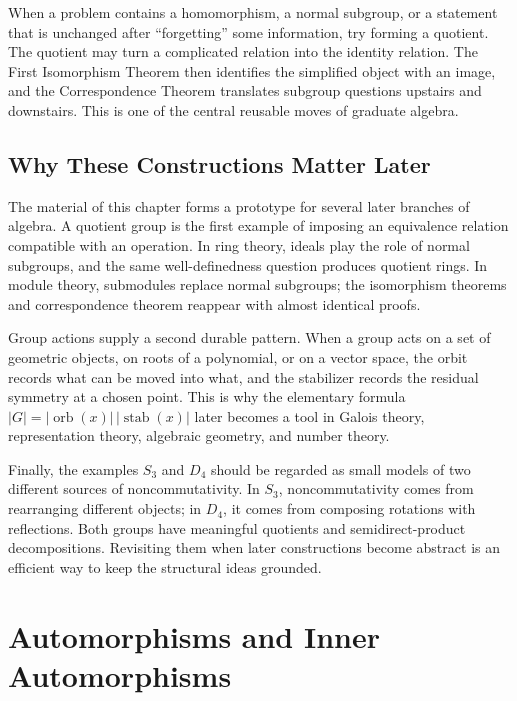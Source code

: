 \begin{remark}
When a problem contains a homomorphism, a normal subgroup, or a statement that
is unchanged after ``forgetting'' some information, try forming a quotient.
The quotient may turn a complicated relation into the identity relation.  The
First Isomorphism Theorem then identifies the simplified object with an image,
and the Correspondence Theorem translates subgroup questions upstairs and
downstairs.  This is one of the central reusable moves of graduate algebra.
\end{remark}

\subsection*{Why These Constructions Matter Later}

The material of this chapter forms a prototype for several later branches of
algebra.  A quotient group is the first example of imposing an equivalence
relation compatible with an operation.  In ring theory, ideals play the role
of normal subgroups, and the same well-definedness question produces quotient
rings.  In module theory, submodules replace normal subgroups; the isomorphism
theorems and correspondence theorem reappear with almost identical proofs.

Group actions supply a second durable pattern.  When a group acts on a set of
geometric objects, on roots of a polynomial, or on a vector space, the orbit
records what can be moved into what, and the stabilizer records the residual
symmetry at a chosen point.  This is why the elementary formula
\(|G|=|\operatorname{orb}(x)|\,|\operatorname{stab}(x)|\) later becomes a tool in Galois theory, representation
theory, algebraic geometry, and number theory.

Finally, the examples \(S_3\) and \(D_4\) should be regarded as small models
of two different sources of noncommutativity.  In \(S_3\), noncommutativity
comes from rearranging different objects; in \(D_4\), it comes from composing
rotations with reflections.  Both groups have meaningful quotients and
semidirect-product decompositions.  Revisiting them when later constructions
become abstract is an efficient way to keep the structural ideas grounded.

\section{Automorphisms and Inner Automorphisms}

